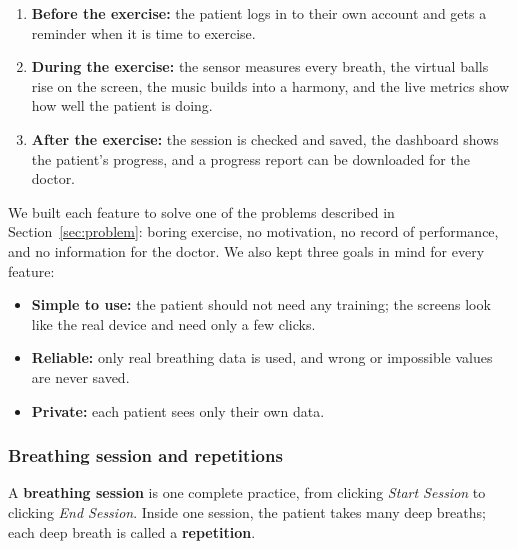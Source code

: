 \documentclass[12pt,a4paper]{article}
\begin{document}
\begin{enumerate}
  \item \textbf{Before the exercise:} the patient logs in to their own account and gets a reminder when it is time to exercise.
  \item \textbf{During the exercise:} the sensor measures every breath, the virtual balls rise on the screen, the music builds into a harmony, and the live metrics show how well the patient is doing.
  \item \textbf{After the exercise:} the session is checked and saved, the dashboard shows the patient's progress, and a progress report can be downloaded for the doctor.
\end{enumerate}

We built each feature to solve one of the problems described in Section~\ref{sec:problem}: boring exercise, no motivation, no record of performance, and no information for the doctor. We also kept three goals in mind for every feature:
\begin{itemize}
  \item \textbf{Simple to use:} the patient should not need any training; the screens look like the real device and need only a few clicks.
  \item \textbf{Reliable:} only real breathing data is used, and wrong or impossible values are never saved.
  \item \textbf{Private:} each patient sees only their own data.
\end{itemize}

\subsubsection{Breathing session and repetitions}
\label{sec:feat-visual}
A \textbf{breathing session} is one complete practice, from clicking \emph{Start Session} to clicking \emph{End Session}. Inside one session, the patient takes many deep breaths; each deep breath is called a \textbf{repetition}.
\end{document}
